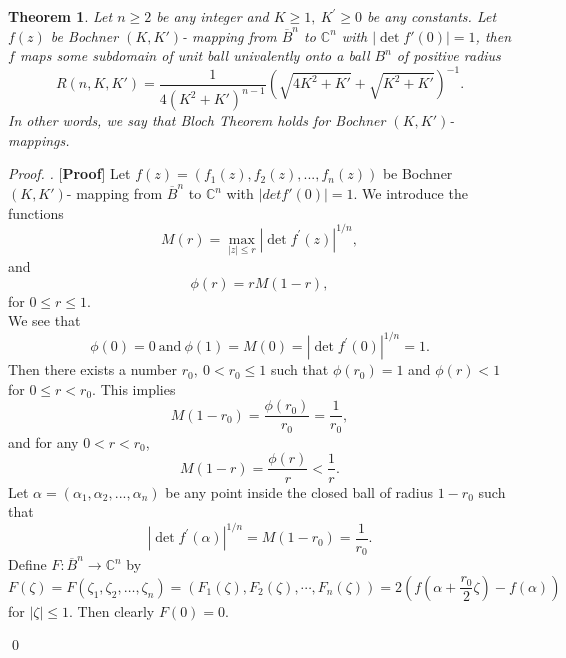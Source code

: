 \documentclass[a4paper,12pt,reqno]{amsart}
\theoremstyle{plain}
\newtheorem{thm}{Theorem}
\theoremstyle{definition}
\newenvironment{pf}[1][]{%
	\vskip 3mm
	\noindent
	\ifthenelse{\equal{#1}{}}%
	{{\slshape Proof. }}%
	{{\slshape #1.} }%
}%
{\qed\bigskip}
\numberwithin{equation}{section}
\begin{document}
\begin{thm}\label{Rohi-Vasu-P2-Theorem-001}
  Let $n \geq 2$ be any integer and $K \geq 1, \ K^{\prime} \geq 0$ be any  constants. Let $ f(z)$ be Bochner $\left(K, K'\right)$- mapping from $\overline{B}^n$ to $\mathbb{C}^n$ with $|\operatorname{det} f'(0)|=1$, then $f$ maps some subdomain of unit ball univalently onto a ball $B^n$ of positive radius 
$$R(n,K,K')=\frac{1}{4(K^2+K')^{n-1}}\left(\sqrt{4K^2+K'}+\sqrt{K^2+K'}\right)^{-1}.$$
In other words, we say that Bloch Theorem holds for Bochner $(K, K')$- mappings.
\end{thm}
\begin{pf} [{\bf Proof}]
Let $f(z)=(f_1(z), f_2(z),...,f_n(z))$ be Bochner $(K,K')$- mapping from $\overline{B}^n$ to $\mathbb{C}^n$ with $|det f'(0)|=1$. We introduce the functions
$$
M(r)=  \max _{|z| \leq r}\left|\operatorname{det} f^{\prime}(z)\right|^{1/n}, 
$$ and  $$  \phi(r)=r M(1-r),
$$
for $0 \leq r \leq 1 $.\\
We see that
$$
\phi(0)=0\ \text{and}\ \phi(1)=M(0)=\left|\operatorname{det} f^{\prime}(0)\right|^{1/n}=1.
$$
Then there exists a number $r_0, \ 0<r_0 \leq 1$ such that
$
\phi\left(r_0\right)=1
$
and $\phi(r)<1$ for $0 \leq r<r_0.$
This implies
$$
M\left(1-r_0\right)=\frac{\phi\left(r_0\right)}{r_0}=\frac{1}{r_0},
$$
and for any $0<r<r_0$,
\begin{equation}\label{Rohi-Vasu-P2-equation-001}
M(1-r)=\frac{\phi(r)}{r}<\frac{1}{r}. 
\end{equation} 
Let $\alpha=(\alpha_1,\alpha_2,...,\alpha_n)$ be any point inside the closed ball of radius $1-r_0$ such that
 $$\left|\operatorname{det} f^{\prime}(\alpha)\right|^{1 / n}=M\left(1-r_0\right)=\frac{1}{r_0}.$$
Define $ F:\overline{B}^n \rightarrow \mathbb{C}^n $ by
$$
 F(\zeta)=F\left(\zeta_1, \zeta_2, \ldots, \zeta_n\right)=(F_1(\zeta),F_2(\zeta),\cdots,F_n(\zeta))=2\left(f\left(\alpha+\frac{r_0}{2} \zeta\right)-f(\alpha)\right) 
$$
for $|\zeta| \leq 1.$
Then clearly $F(0)=0$.


\end{pf}
\end{document}
